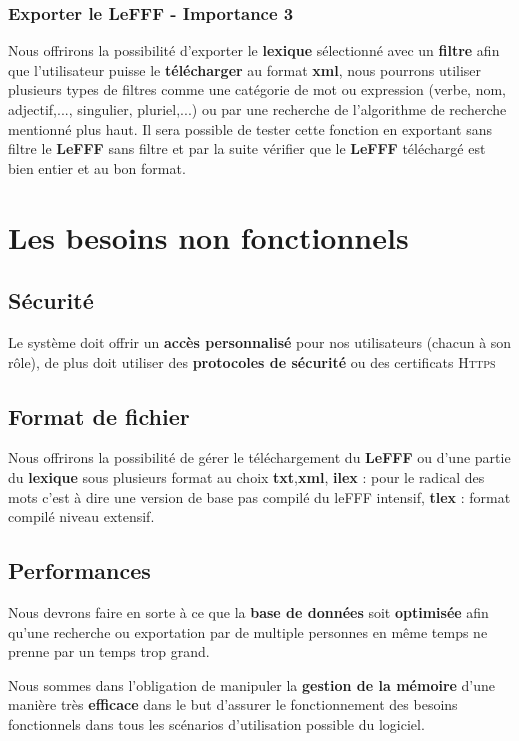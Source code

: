  
\subsubsection{Exporter le LeFFF - Importance 3}

{Nous offrirons la possibilité d'exporter le \textbf{lexique} sélectionné avec un \textbf{filtre} afin que l'utilisateur puisse le \textbf{télécharger} au format \textbf{xml}, nous pourrons utiliser plusieurs types de filtres comme une catégorie de mot ou expression (verbe, nom, adjectif,..., singulier, pluriel,...) ou par une recherche de l'algorithme de recherche mentionné plus haut. Il sera possible de tester cette fonction en exportant sans filtre le \textbf{LeFFF} sans filtre et par la suite vérifier que le \textbf{LeFFF} téléchargé est bien entier et au bon format.\par}



\section{Les besoins non fonctionnels}

\subsection{Sécurité}
{Le système doit offrir un \textbf{accès personnalisé} pour nos utilisateurs (chacun à son rôle), de plus doit utiliser des \textbf{protocoles de sécurité} ou des certificats \textsc{Https} }

\subsection{Format de fichier}
Nous offrirons la possibilité de gérer le téléchargement du \textbf{LeFFF} ou d'une partie du \textbf{lexique} sous plusieurs format au choix  \textbf{txt},\textbf{xml}, \textbf{ilex} : pour le radical des mots c'est à dire une version de base pas compilé du leFFF intensif, \textbf{tlex} : format compilé niveau extensif.

\subsection{Performances}

{Nous devrons faire en sorte à ce que la \textbf{base de données} soit \textbf{optimisée} afin qu'une recherche ou exportation par de multiple personnes en même temps ne prenne par un temps trop grand.\par}
Nous sommes dans l'obligation de manipuler la \textbf{gestion de la mémoire} d'une manière très \textbf{efficace} dans le but d'assurer le fonctionnement des besoins fonctionnels dans tous les scénarios d'utilisation possible du logiciel. 

